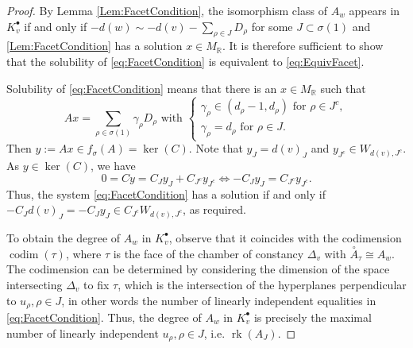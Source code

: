 \documentclass[reqno, 12pt]{amsart}
\theoremstyle{definition}
\numberwithin{equation}{section}
\newcommand{\R}{\mathbb{R}}
\newcommand{\opA}{\overset{\circ}{A}}
\begin{document}
\begin{proof}
 By Lemma \ref{Lem:FacetCondition}, the isomorphism class of $A_w$ appears in $K_v^\bullet$ if and only if $-d(w)\sim -d(v)-\sum_{\rho\in J}D_\rho$ for some $J\subset \sigma(1)$ and \eqref{Lem:FacetCondition} has a solution $x\in M_\R$. It is therefore sufficient to show that the solubility of \eqref{eq:FacetCondition} is equivalent to \eqref{eq:EquivFacet}. 


 Solubility of \eqref{eq:FacetCondition} means that there is an $x\in M_\R$ such that \[Ax=\sum_{\rho\in \sigma(1)}\gamma_\rho D_\rho\text{ with }\begin{cases}
     \gamma_\rho\in (d_\rho-1,d_\rho)\text{ for }\rho\in J^c,\\
     \gamma_\rho=d_\rho\text{ for }\rho \in J.
 \end{cases}\]
 Then $y:=Ax\in f_\sigma(A)=\ker(C)$. Note that $y_{J}=d(v)_J$ and $y_{J^c}\in W_{d(v),J^c}$. As $y\in \ker(C)$, we have\[
 0=Cy=C_J y_J+C_{J^c}y_{J^c}\Leftrightarrow -C_Jy_J=C_{J^c}y_{J^c}.
 \]
 Thus, the system \eqref{eq:FacetCondition} has a solution if and only if $-C_Jd(v)_J=-C_Jy_J\in C_{J^c}W_{d(v),J^c}$, as required.

 To obtain the degree of $A_w$ in $K_v^\bullet$, observe that it coincides with the codimension $\operatorname{codim}(\tau)$, where $\tau$ is the face of the chamber of constancy $\Delta_v$ with $\opA_\tau\cong A_w$. 
 The codimension can be determined by considering the dimension of the space intersecting $\Delta_v$ to fix $\tau$, which is the intersection of the hyperplanes perpendicular to $u_\rho, \rho\in J$, in other words the number of linearly independent equalities in \ref{eq:FacetCondition}. Thus, the degree of $A_w$ in $K_v^\bullet$ is precisely the maximal number of linearly independent $u_\rho, \rho\in J$, i.e. $\operatorname{rk}(A_J)$.
\end{proof}
\end{document}
